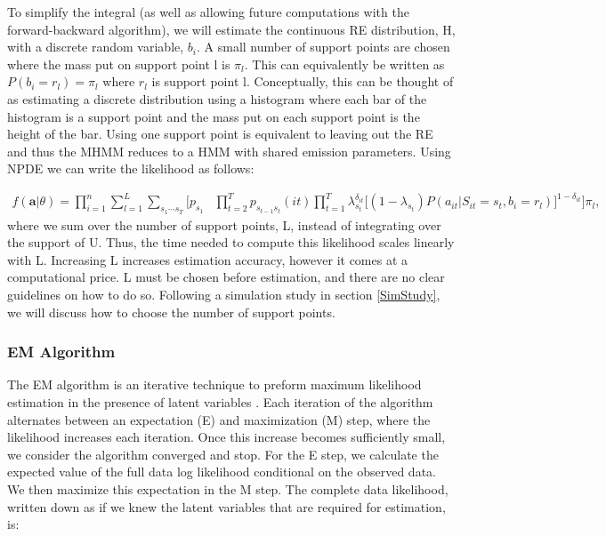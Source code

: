 \documentclass{article}
\begin{document}
To simplify the integral (as well as allowing future computations with the forward-backward algorithm), we will estimate the continuous RE distribution, H, with a discrete random variable, $b_i$. A small number of support points are chosen where the mass put on support point l is $\pi_l$. This can equivalently be written as $P(b_i = r_l) = \pi_l$ where $r_l$ is support point l. Conceptually, this can be thought of as estimating a discrete distribution using a histogram where each bar of the histogram is a support point and the mass put on each support point is the height of the bar. Using one support point is equivalent to leaving out the RE and thus the MHMM reduces to a HMM with shared emission parameters. Using NPDE we can write the likelihood as follows: 

\begin{equation*}\label{like2}
    \begin{split}
f(\textbf{a}|\theta) = \prod_{i=1}^n \sum_{l=1}^L \sum_{{s_1}\cdots{s_T}} \biggr[ 
    p_{s_1} & \prod_{t=2}^T p_{s_{t-1}s_t}(it) 
    \prod_{t=1}^T \lambda_{s_t}^{\delta_{it}} \big[(1-\lambda_{s_t})P(a_{it}|S_{it}=s_t,b_i=r_l)\big]^{1-\delta_{it}} \biggr] \pi_l,
    \end{split}
\end{equation*}
where we sum over the number of support points, L, instead of integrating over the support of U. Thus, the time needed to compute this likelihood scales linearly with L. Increasing L increases estimation accuracy, however it comes at a computational price. L must be chosen before estimation, and there are no clear guidelines on how to do so. Following a simulation study in section \ref{SimStudy}, we will discuss how to choose the number of support points.

\subsubsection{EM Algorithm}

The EM algorithm is an iterative technique to preform maximum likelihood estimation in the presence of latent variables \cite{dempster1977}. Each iteration of the algorithm alternates between an expectation (E) and maximization (M) step, where the likelihood increases each iteration. Once this increase becomes sufficiently small, we consider the algorithm converged and stop. For the E step, we calculate the expected value of the full data log likelihood conditional on the observed data. We then maximize this expectation in the M step. The complete data likelihood, written down as if we knew the latent variables that are required for estimation, is: 
\end{document}
